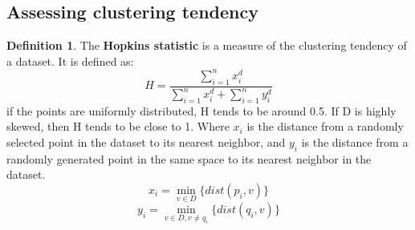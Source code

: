 \documentclass[12pt, openany]{report}
\theoremstyle{definition}
\newtheorem{definition}[thm]{Definition}
\begin{document}
\subsection{Assessing clustering tendency}
\begin{definition}
    The \textbf{Hopkins statistic} is a measure of the clustering tendency of a dataset. It is defined as:
    \begin{equation}
        H = \frac{\sum_{i=1}^{n} x_i^d}{\sum_{i=1}^{n} x_i^d + \sum_{i=1}^{n} y_i^d}
    \end{equation}
    if the points are uniformly distributed, H tends to be around 0.5. If D is highly skewed, then H tends to be close to 1. Where $x_i$ is the distance from a randomly selected point in the dataset to its nearest neighbor, and $y_i$ is the distance from a randomly generated point in the same space to its nearest neighbor in the dataset.
    \begin{equation}
        x_i = \min_{v \in D} \{dist(p_i,v)\}
    \end{equation}
    \begin{equation}
        y_i = \min_{v \in D, v \neq q_i} \{dist(q_i,v)\}
    \end{equation}
\end{definition}
\end{document}
